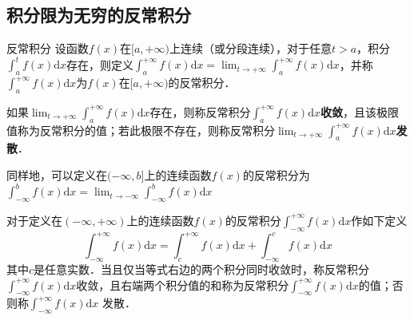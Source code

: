 \begin{issues}
\issueTODO
\end{issues}

\subsection{积分限为无穷的反常积分}
\begin{definition}{反常积分}
设函数$f(x)$在$[a, +\infty)$上连续（或分段连续），对于任意$t>a$，积分$\displaystyle \int^t_af(x)\mathrm{d} x$存在，则定义$\displaystyle \int ^{+\infty}_a f(x)\mathrm{d} x=\lim_{t\rightarrow+\infty }\int _a^{+\infty}f(x)\mathrm{d} x$，并称$\displaystyle \int ^{+\infty}_a f(x)\mathrm{d} x $为$f(x)$在$[a, +\infty)$的反常积分．

如果$\displaystyle \lim_{t\rightarrow+\infty }\int _a^{+\infty}f(x)\mathrm{d} x$存在，则称反常积分$\displaystyle \int ^{+\infty}_a f(x)\mathrm{d} x$\textbf{收敛}，且该极限值称为反常积分的值；若此极限不存在，则称反常积分$\displaystyle \lim_{t\rightarrow+\infty }\int _a^{+\infty}f(x)\mathrm{d} x$\textbf{发散}．
\end{definition}

同样地，可以定义在$(-\infty,b]$上的连续函数$f(x)$的反常积分为$\displaystyle \int ^b _{-\infty}f(x)\mathrm{d} x=\lim_{t\rightarrow-\infty }\int ^b _{-\infty}f(x)\mathrm{d} x$

对于定义在$(-\infty,+\infty )$上的连续函数$f(x)$的反常积分$\displaystyle \int ^{+\infty}_{-\infty}f(x)\mathrm{d} x$作如下定义
$$\displaystyle \int ^{+\infty}_{-\infty}f(x)\mathrm{d} x=\displaystyle \int ^{+\infty}_c f(x)\mathrm{d} x+\displaystyle \int ^c _{-\infty}f(x)\mathrm{d} x$$
其中$c$是任意实数．当且仅当等式右边的两个积分同时收敛时，称反常积分$\displaystyle \int ^{+\infty}_{-\infty}f(x)\mathrm{d} x$收敛，且右端两个积分值的和称为反常积分$\displaystyle \int ^{+\infty}_{-\infty}f(x)\mathrm{d} x$的值；否则称$\displaystyle \int ^{+\infty}_{-\infty}f(x)\mathrm{d} x$ 发散．
